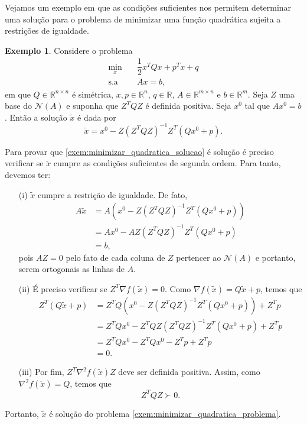 \documentclass[12pt,a4paper]{scrartcl}
\def\RR{\mathds{R}}
\theoremstyle{definition}%
\newtheorem{exem}{Exemplo}
\begin{document}
Vejamos um exemplo em que as condições suficientes nos permitem determinar uma solução para o problema de minimizar uma função quadrática sujeita a restrições de igualdade.

\begin{exem}
Considere o problema
\[ \begin{aligned} \label{exem:minimizar_quadratica_problema}
\min_{x} & \quad \dfrac{1}{2}x^{T}Qx + p^{T}x + q \\
\text{s.a} & \quad Ax = b,
\end{aligned} \]
em que $Q \in \RR^{n\times n}$ é simétrica, $ x,p \in \RR^{n}$, $q \in \RR$, $A \in \RR^{m\times n}$ e $b \in \RR^{m}$. Seja $Z$ uma base do $\mathcal{N}(A)$ e suponha que $Z^{T}QZ$ é definida positiva. Seja $x^{0}$ tal que $Ax^{0}=b$. Então a solução $\tilde{x}$ é dada por
\[ \label{exem:minimizar_quadratica_solucao}
\tilde{x} = x^{0} - Z(Z^{T}QZ)^{-1} Z^{T}(Qx^{0} + p).
\]
\end{exem}
Para provar que \eqref{exem:minimizar_quadratica_solucao} é solução é preciso verificar se $\tilde{x}$ cumpre as condições suficientes de segunda ordem. Para tanto, devemos ter:
\begin{enumerate}
	\item[(i)] $\tilde{x}$ cumpre a restrição de igualdade. De fato,
	\[ \begin{aligned}
	A\tilde{x} &= A(x^{0} - Z(Z^{T}QZ)^{-1} Z^{T}(Qx^{0} + p)) \\
	&= Ax^{0} - AZ(Z^{T}QZ)^{-1} Z^{T}(Qx^{0} + p) \\
	&= b,
	\end{aligned} \]
	pois $AZ=0$ pelo fato de cada coluna de $Z$ pertencer ao $\mathcal{N}(A)$ e portanto, serem ortogonais as linhas de $A$.

	\item[(ii)] É preciso verificar se $Z^{T}\nabla f(\tilde{x}) = 0$. Como $\nabla f(\tilde{x}) = Q\tilde{x} + p$, temos que
	\[ \begin{aligned}
	Z^{T}(Q\tilde{x} +p) &= Z^{T} Q (x^{0} - Z(Z^{T}QZ)^{-1}Z^{T}(Qx^{0} +p)) + Z^{T}p \\
	&= Z^{T} Qx^{0} - Z^{T}QZ(Z^{T}QZ)^{-1}Z^{T}(Qx^{0} +p) + Z^{T}p \\
	&= Z^{T} Qx^{0} - Z^{T} Qx^{0} - Z^{T} p + Z^{T} p \\
	&= 0.
	\end{aligned} \]

	\item[(iii)] Por fim, $Z^{T}\nabla^{2} f(\tilde{x})Z$ deve ser definida positiva. Assim, como $\nabla^{2} f(\tilde{x}) = Q$, temos que 
	\[
	Z^{T}QZ \succ 0.
	\]
\end{enumerate}
Portanto, $\tilde{x}$ é solução do problema \eqref{exem:minimizar_quadratica_problema}.
\end{document}
